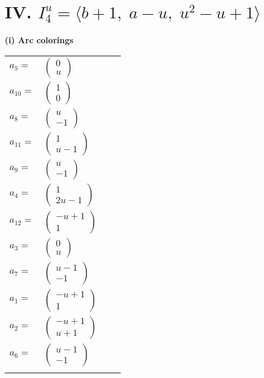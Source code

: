 \documentclass[1p]{elsarticle_modified}
\theoremstyle{definition}
\begin{document}
\centering \section*{IV. $I^u_{4}= \langle b+1,\;a- u,\;u^2- u+1 \rangle$}
\flushleft \textbf{(i) Arc colorings}\\
\begin{tabular}{m{7pt} m{180pt} m{7pt} m{180pt} }
\flushright $a_{5}=$&$\begin{pmatrix}0\\u\end{pmatrix}$ \\
\flushright $a_{10}=$&$\begin{pmatrix}1\\0\end{pmatrix}$ \\
\flushright $a_{8}=$&$\begin{pmatrix}u\\-1\end{pmatrix}$ \\
\flushright $a_{11}=$&$\begin{pmatrix}1\\u-1\end{pmatrix}$ \\
\flushright $a_{9}=$&$\begin{pmatrix}u\\-1\end{pmatrix}$ \\
\flushright $a_{4}=$&$\begin{pmatrix}1\\2 u-1\end{pmatrix}$ \\
\flushright $a_{12}=$&$\begin{pmatrix}- u+1\\1\end{pmatrix}$ \\
\flushright $a_{3}=$&$\begin{pmatrix}0\\u\end{pmatrix}$ \\
\flushright $a_{7}=$&$\begin{pmatrix}u-1\\-1\end{pmatrix}$ \\
\flushright $a_{1}=$&$\begin{pmatrix}- u+1\\1\end{pmatrix}$ \\
\flushright $a_{2}=$&$\begin{pmatrix}- u+1\\u+1\end{pmatrix}$ \\
\flushright $a_{6}=$&$\begin{pmatrix}u-1\\-1\end{pmatrix}$\\&\end{tabular}
\end{document}
